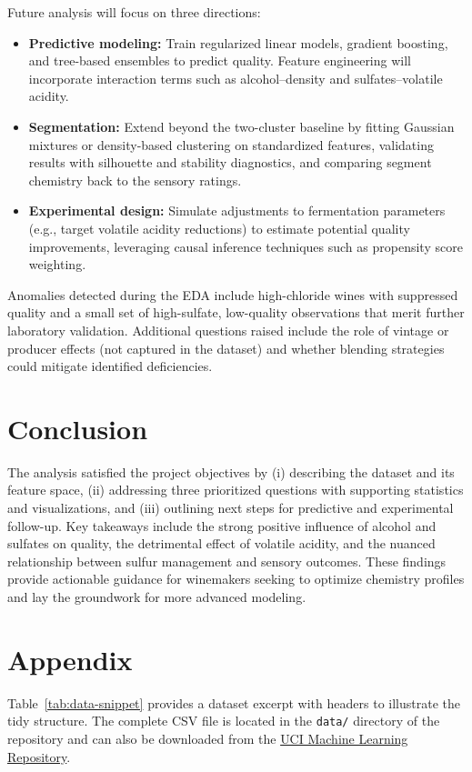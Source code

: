 \documentclass[11pt]{article}
\begin{document}
Future analysis will focus on three directions:
\begin{itemize}
  \item \textbf{Predictive modeling:} Train regularized linear models, gradient boosting, and tree-based ensembles to predict quality. Feature engineering will incorporate interaction terms such as alcohol--density and sulfates--volatile acidity.
  \item \textbf{Segmentation:} Extend beyond the two-cluster baseline by fitting Gaussian mixtures or density-based clustering on standardized features, validating results with silhouette and stability diagnostics, and comparing segment chemistry back to the sensory ratings.
  \item \textbf{Experimental design:} Simulate adjustments to fermentation parameters (e.g., target volatile acidity reductions) to estimate potential quality improvements, leveraging causal inference techniques such as propensity score weighting.
\end{itemize}

Anomalies detected during the EDA include high-chloride wines with suppressed
quality and a small set of high-sulfate, low-quality observations that merit
further laboratory validation. Additional questions raised include the role of
vintage or producer effects (not captured in the dataset) and whether blending
strategies could mitigate identified deficiencies.

\section{Conclusion}
The analysis satisfied the project objectives by (i) describing the dataset and
its feature space, (ii) addressing three prioritized questions with supporting
statistics and visualizations, and (iii) outlining next steps for predictive and
experimental follow-up. Key takeaways include the strong positive influence of
alcohol and sulfates on quality, the detrimental effect of volatile acidity,
and the nuanced relationship between sulfur management and sensory outcomes.
These findings provide actionable guidance for winemakers seeking to optimize
chemistry profiles and lay the groundwork for more advanced modeling.

\section*{Appendix}
Table~\ref{tab:data-snippet} provides a dataset excerpt with headers to
illustrate the tidy structure. The complete CSV file is located in the
\texttt{data/} directory of the repository and can also be downloaded from the
\href{https://archive.ics.uci.edu/dataset/186/wine+quality}{UCI Machine Learning Repository}.
\end{document}
